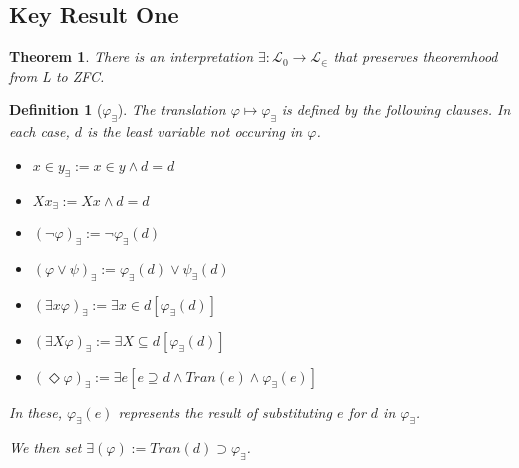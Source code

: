 \documentclass{article}
\newtheorem{definition}{Definition}
\newtheorem{theorem}{Theorem}
\begin{document}
\subsection{Key Result One}
\begin{theorem} 
There is an interpretation $\exists : \mathcal{L}_0 \to \mathcal{L}_\in$ that preserves 
theoremhood from L to ZFC.
\end{theorem}
\begin{definition}[$\varphi_\exists$]
    The translation $\varphi \mapsto \varphi_\exists$ is defined by the following clauses.
    In each case, $d$ is the least variable not occuring in $\varphi$.
    \begin{itemize}
        \item $x \in y_\exists := x \in y \wedge d = d$
        \item $Xx_\exists := Xx \wedge d = d$
        \item $(\neg \varphi)_\exists := \neg \varphi_\exists(d)$
        \item $(\varphi \vee \psi)_\exists := \varphi_\exists(d) \vee \psi_\exists(d)$
        \item $(\exists x \varphi)_\exists := \exists x \in d[ \varphi_\exists(d)]$
        \item $(\exists X \varphi)_\exists := \exists X \subseteq d [ \varphi_\exists(d)]$
        \item $(\Diamond \varphi)_\exists := \exists e[e \supseteq d \wedge Tran(e) \wedge \varphi_\exists(e)]$
    \end{itemize}
    In these, $\varphi_\exists(e)$ represents the result of substituting $e$ for $d$ in
    $\varphi_\exists$.

    We then set $\exists(\varphi) := Tran(d) \supset \varphi_\exists$.
\end{definition}
\end{document}
